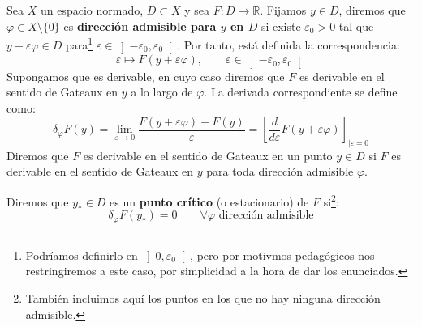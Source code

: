 \noindent
Sea $X$ un espacio normado, $D\subset X$ y sea $F:D\to \mathbb{R}$. Fijamos $y\in D$, diremos que $\varphi \in X\setminus \{0\}$ es \textbf{dirección admisible para $y$ en $D$} si existe $\varepsilon_0>0$ tal que $y+\varepsilon\varphi \in D$ para\footnote{Podríamos definirlo en $\left]0,\varepsilon_0\right[$, pero por motivmos pedagógicos nos restringiremos a este caso, por simplicidad a la hora de dar los enunciados.} $\varepsilon \in \left]-\varepsilon_0,\varepsilon_0\right[$. Por tanto, está definida la correspondencia:
\begin{equation*}
    \varepsilon\longmapsto F(y+\varepsilon\varphi), \qquad \varepsilon \in \left]-\varepsilon_0,\varepsilon_0\right[
\end{equation*}
Supongamos que es derivable, en cuyo caso diremos que $F$ es derivable en el sentido de Gateaux en $y$ a lo largo de $\varphi$. La derivada correspondiente se define como:
\begin{equation*}
    \delta_\varphi F(y) = \lim_{\varepsilon\to0} \frac{F(y+\varepsilon\varphi)-F(y)}{\varepsilon} = \left[\frac{d}{d\varepsilon}F(y+\varepsilon\varphi)\right]_{\big|\varepsilon=0}
\end{equation*}
Diremos que $F$ es derivable en el sentido de Gateaux en un punto $y\in D$ si $F$ es derivable en el sentido de Gateaux en $y$ para toda dirección admisible $\varphi$.

\noindent
Diremos que $y_\ast\in D$ es un \textbf{punto crítico} (o estacionario) de $F$ si\footnote{También incluimos aquí los puntos en los que no hay ninguna dirección admisible.}:
\begin{equation*}
    \delta_\varphi F(y_\ast) = 0 \qquad \forall \varphi \text{\ dirección admisible}
\end{equation*}

